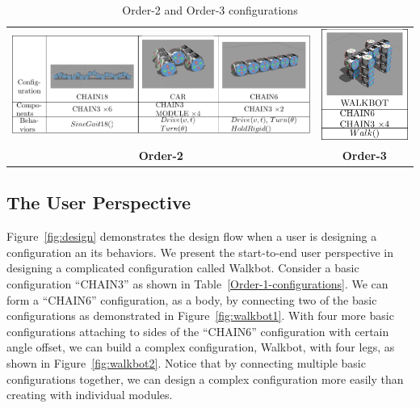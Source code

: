 \documentclass[conference]{IEEEtran}
\theoremstyle{definition}
\begin{document}
\begin{table}
    \begin{center}
        \begin{tabular}{c c}
        \includegraphics[scale=0.9]{images/library/tier2.pdf} &
        \includegraphics[scale=1]{images/library/tier3.pdf} \\
        \textbf{Order-2} & \textbf{Order-3}
        \end{tabular}
        \caption{Order-2 and Order-3 configurations}
        \label{Order-2-configurations}
    \end{center}
\end{table}

\subsection{The User Perspective}
Figure~\ref{fig:design} demonstrates the design flow when a user is designing a configuration an its behaviors. We present the start-to-end user perspective in designing a complicated configuration called Walkbot. Consider a basic configuration ``CHAIN3'' as shown in Table~\ref{Order-1-configurations}. We can form a ``CHAIN6'' configuration, as a body, by connecting two of the basic configurations as demonstrated in Figure~\ref{fig:walkbot1}. With four more basic configurations attaching to sides of the ``CHAIN6'' configuration with certain angle offset, we can build a complex configuration, Walkbot, with four legs, as shown in Figure~\ref{fig:walkbot2}. Notice that by connecting multiple  basic configurations together, we can design a complex configuration more easily than creating with individual modules.
\end{document}
